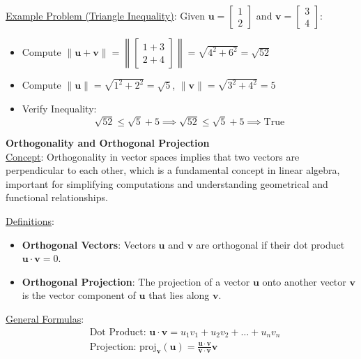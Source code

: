 \documentclass[8pt, a4paper, landscape]{extarticle} %
\begin{document}
\begin{multicols*}{4}
  \underline{Example Problem (Triangle Inequality)}:
  Given \( \mathbf{u} = \begin{bmatrix} 1 \\ 2 \end{bmatrix} \) and \( \mathbf{v} = \begin{bmatrix} 3 \\ 4 \end{bmatrix} \):
  \begin{itemize}
    \item Compute \(\|\mathbf{u} + \mathbf{v}\| = \left\|\begin{bmatrix} 1+3 \\ 2+4 \end{bmatrix}\right\| = \sqrt{4^2 + 6^2} = \sqrt{52}\)
    \item Compute \(\|\mathbf{u}\| = \sqrt{1^2 + 2^2} = \sqrt{5}\), \(\|\mathbf{v}\| = \sqrt{3^2 + 4^2} = 5\)
    \item Verify Inequality:
          \[
            \sqrt{52} \leq \sqrt{5} + 5 \implies \sqrt{52} \leq \sqrt{5} + 5 \implies \text{True}
          \]
  \end{itemize}


  \textbf{Orthogonality and Orthogonal Projection}\\
  \underline{Concept}: Orthogonality in vector spaces implies that two vectors are perpendicular to each other, which is a fundamental concept in linear algebra, important for simplifying computations and understanding geometrical and functional relationships.

  \underline{Definitions}:
  \begin{itemize}
    \item \textbf{Orthogonal Vectors}: Vectors \(\mathbf{u}\) and \(\mathbf{v}\) are orthogonal if their dot product \(\mathbf{u} \cdot \mathbf{v} = 0\).
    \item \textbf{Orthogonal Projection}: The projection of a vector \(\mathbf{u}\) onto another vector \(\mathbf{v}\) is the vector component of \(\mathbf{u}\) that lies along \(\mathbf{v}\).
  \end{itemize}

  \underline{General Formulas}:
  \[
    \begin{aligned}
       & \text{Dot Product: } \mathbf{u} \cdot \mathbf{v} = u_1 v_1 + u_2 v_2 + \ldots + u_n v_n                                               \\
       & \text{Projection: } \text{proj}_{\mathbf{v}}(\mathbf{u}) = \frac{\mathbf{u} \cdot \mathbf{v}}{\mathbf{v} \cdot \mathbf{v}} \mathbf{v}
    \end{aligned}
  \]



\end{multicols*}
\end{document}
